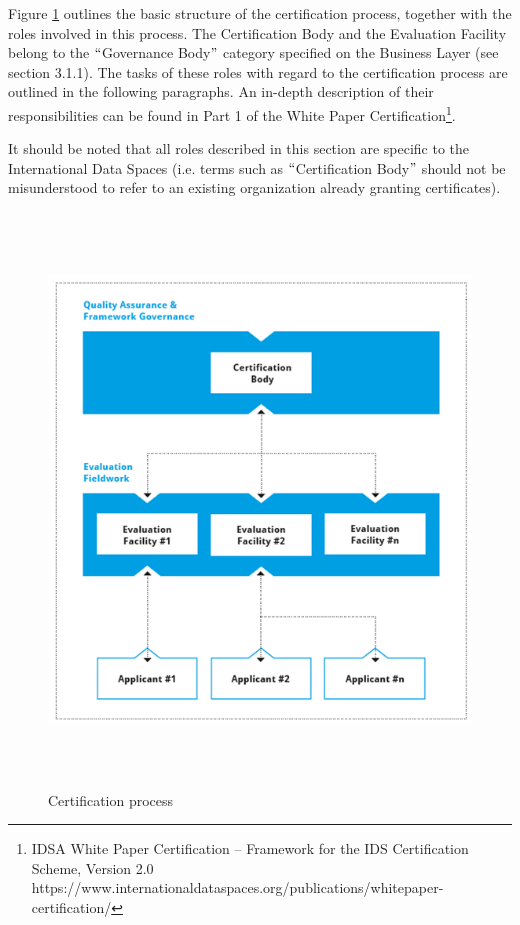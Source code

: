 Figure \ref{fig:Certification_process} outlines the basic structure of the certification process, together with the roles involved in this process. The Certification Body and the Evaluation Facility belong to the $``$Governance Body$"$  category specified on the Business Layer (see section 3.1.1). The tasks of these roles with regard to the certification process are outlined in the following paragraphs. An in-depth description of their responsibilities can be found in Part 1 of the White Paper Certification\footnote{ IDSA White Paper Certification – Framework for the IDS Certification Scheme, Version 2.0 https://www.internationaldataspaces.org/publications/whitepaper-certification/ }.


It should be noted that all roles described in this section are specific to the International Data Spaces (i.e. terms such as $``$Certification Body$"$  should not be misunderstood to refer to an existing organization already granting certificates).




\begin{figure}[H]
	\begin{Center}
		\includegraphics[width=5.63in,height=5.98in]{./media/image79.png}
		\caption{Certification process}
		\label{fig:Certification_process}
	\end{Center}
\end{figure}



